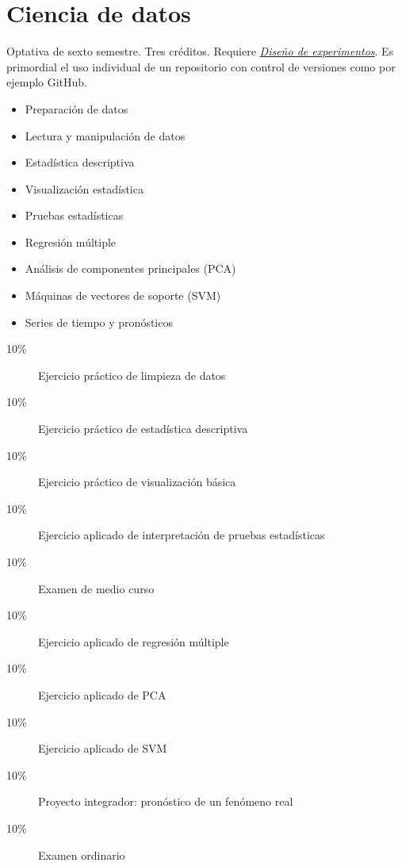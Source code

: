 \documentclass{article}
\begin{document}
\begin{multicols}{4}
\vfill\null \columnbreak

\hypertarget{cdd}{\section*{Ciencia de datos}}   

Optativa de sexto semestre. Tres cr\'{e}ditos. Requiere
\hyperlink{dde}{\em Dise\~{n}o de experimentos}. Es primordial el uso
individual de un repositorio con control de versiones como por ejemplo
GitHub.

\begin{itemize}
\item{Preparaci\'{o}n de datos}
\item{Lectura y manipulaci\'{o}n de datos}
\item{Estad\'{i}stica descriptiva}
\item{Visualizaci\'{o}n estad\'{i}stica}
\item{Pruebas estad\'{i}sticas}
\item{Regresi\'{o}n m\'{u}ltiple}
\item{An\'{a}lisis de componentes principales (PCA)}
\item{M\'{a}quinas de vectores de soporte (SVM)}  
\item{Series de tiempo y pron\'{o}sticos}
\end{itemize}

\begin{description}
\item[10\%]{Ejercicio pr\'{a}ctico de limpieza de datos}
\item[10\%]{Ejercicio pr\'{a}ctico de estad\'{i}stica descriptiva}
\item[10\%]{Ejercicio pr\'{a}ctico de visualizaci\'{o}n b\'{a}sica}
\item[10\%]{Ejercicio aplicado de interpretaci\'{o}n de pruebas
  estad\'{i}sticas}
\item[10\%]{Examen de medio curso}  
\item[10\%]{Ejercicio aplicado de regresi\'{o}n m\'{u}ltiple}
\item[10\%]{Ejercicio aplicado de PCA}
\item[10\%]{Ejercicio aplicado de SVM}  
\item[10\%]{Proyecto integrador: pron\'{o}stico de un fen\'{o}meno real}
\item[10\%]{Examen ordinario}
\end{description}  

\vfill\null \columnbreak


\end{multicols}
\end{document}
